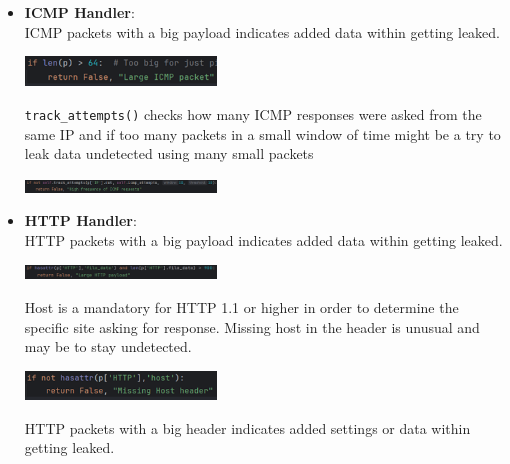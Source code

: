 \documentclass{article}
\begin{document}
\begin{itemize}
\begin{minipage}{\linewidth}
    \end{minipage}
    \item \textbf{ICMP Handler}: \\
    ICMP packets with a big payload indicates added data within getting leaked. \\
    \begin{minipage}{\linewidth}
        \includegraphics[width=0.4\textwidth]{test - icmp 1.png}
    \end{minipage}
    \texttt{track\_attempts()} checks how many ICMP responses were asked from the same IP and if too many   packets in a small window of time might be a try to leak data undetected using many small packets \\
    \begin{minipage}{\linewidth}
        \includegraphics[width=0.4\textwidth]{test - icmp 2.png}
    \end{minipage}
    \item \textbf{HTTP Handler}: \\
    HTTP packets with a big payload indicates added data within getting leaked. \\
    \begin{minipage}{\linewidth}
        \includegraphics[width=0.4\textwidth]{test - http 1.png}
    \end{minipage}
    Host is a mandatory for HTTP 1.1 or higher in order to determine the specific site asking for response. Missing host in the header is unusual and may be to stay undetected. \\
    \begin{minipage}{\linewidth}
        \includegraphics[width=0.4\textwidth]{test - http 2.png}
    \end{minipage}
    HTTP packets with a big header indicates added settings or data within getting leaked. \\

\end{itemize}
\end{document}
